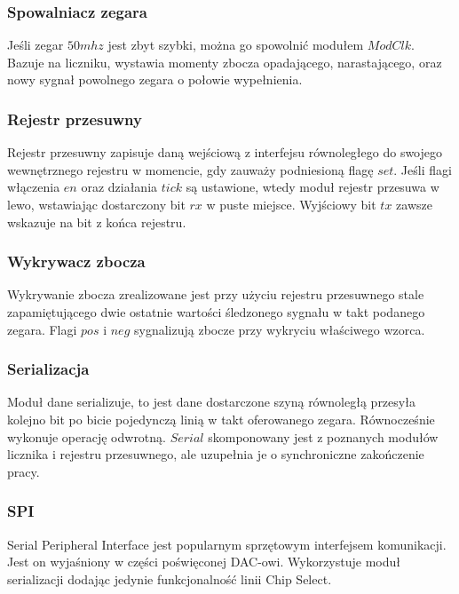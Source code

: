 \documentclass[a4paper,12pt]{article}
\begin{document}
\subsubsection{Spowalniacz zegara}
Jeśli zegar $50mhz$ jest zbyt szybki, można go spowolnić modułem $ModClk$. Bazuje na liczniku, wystawia momenty zbocza opadającego, narastającego, oraz nowy sygnał powolnego zegara o połowie wypełnienia.


\subsubsection{Rejestr przesuwny}
Rejestr przesuwny zapisuje daną wejściową z interfejsu równoległego do swojego wewnętrznego rejestru w momencie, gdy zauważy podniesioną flagę $set$. Jeśli flagi włączenia $en$ oraz działania $tick$ są ustawione, wtedy moduł rejestr przesuwa w lewo, wstawiając dostarczony bit $rx$ w puste miejsce. Wyjściowy bit $tx$ zawsze wskazuje na bit z końca rejestru.


\subsubsection{Wykrywacz zbocza}
Wykrywanie zbocza zrealizowane jest przy użyciu rejestru przesuwnego stale zapamiętującego dwie ostatnie wartości śledzonego sygnału w takt podanego zegara. Flagi $pos$ i $neg$ sygnalizują zbocze przy wykryciu właściwego wzorca.


\subsubsection{Serializacja}
Moduł dane serializuje, to jest dane dostarczone szyną równoległą przesyła kolejno bit po bicie pojedynczą linią w takt oferowanego zegara. Równocześnie wykonuje operację odwrotną. $Serial$ skomponowany jest z poznanych modułów licznika i rejestru przesuwnego, ale uzupełnia je o synchroniczne zakończenie pracy.


\subsubsection{SPI}
Serial Peripheral Interface jest popularnym sprzętowym interfejsem komunikacji. Jest on wyjaśniony w części poświęconej DAC-owi. Wykorzystuje moduł serializacji dodając jedynie funkcjonalność linii Chip Select.

\end{document}
